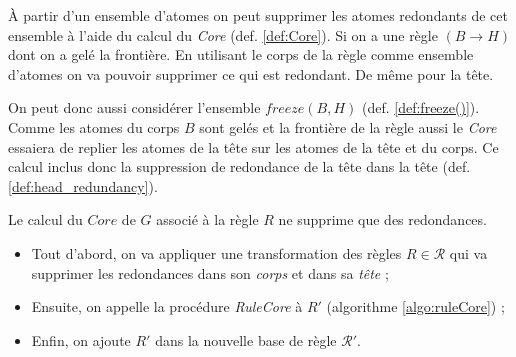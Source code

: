 \par À partir d'un ensemble d'atomes on peut supprimer les atomes redondants de cet ensemble à l'aide du calcul du \textit{Core} (def. \ref{def:Core}).
Si on a une règle $(B \rightarrow H)$ dont on a gelé la frontière. En utilisant le corps de la règle comme ensemble d'atomes on va pouvoir supprimer ce qui est redondant. De même pour la tête.
\par On peut donc aussi considérer l'ensemble $freeze(B, H)$ (def. \ref{def:freeze()}). Comme les atomes du corps $B$ sont gelés et la frontière de la règle aussi le \textit{Core} essaiera de replier les atomes de la tête sur les atomes de la tête et du corps. Ce calcul inclus donc la suppression de redondance de la tête dans la tête (def. \ref{def:head_redundancy}).

    



\begin{proposition}
Le calcul du $Core$ de $G$ associé à la règle $R$ ne supprime que des redondances.
\end{proposition}



\begin{itemize}
    \item Tout d'abord, on va appliquer une transformation des règles $R \in \mathcal{R}$ qui va supprimer les redondances dans son \textit{corps} et dans sa \textit{tête} ;
    \item Ensuite, on appelle la procédure \textit{RuleCore} à $R'$ (algorithme \ref{algo:ruleCore}) ;  
    \item Enfin, on ajoute $R'$ dans la nouvelle base de règle $\mathcal{R'}$.
\end{itemize}


